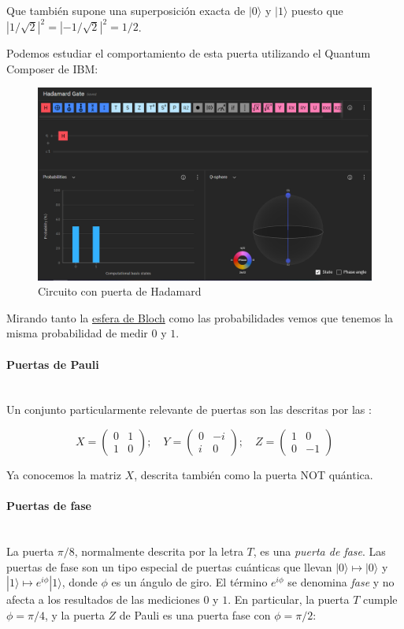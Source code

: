 \documentclass[11pt]{article}
\newcommand{\ra}{\rangle}
\newcommand{\myparagraph}[1]{\paragraph*{#1}\mbox{}\\}
\begin{document}
Que también supone una superposición exacta de $|0\ra$ y $|1\ra$ puesto que $|1/\sqrt 2|^2 = |-1/\sqrt 2|^2 = 1/2$.

Podemos estudiar el comportamiento de esta puerta utilizando el Quantum Composer de IBM:

\begin{figure}[H]
	\centering
	\includegraphics[scale=0.5]{figures/gate-hadamard.png}
	\caption{Circuito con puerta de Hadamard}
\end{figure}

Mirando tanto la \href{URL}{esfera de Bloch} como las probabilidades vemos que tenemos la misma probabilidad de medir $0$ y $1$. \\


\myparagraph{Puertas de Pauli}


Un conjunto particularmente relevante de puertas son las descritas por las :

\[
X =
	\begin{pmatrix}
		0 & 1 \\
		1 & 0 
	\end{pmatrix}; \quad
	Y =
	\begin{pmatrix}
		0 & -i \\
		i & 0 
	\end{pmatrix}; \quad
	Z =
	\begin{pmatrix}
		1 & 0 \\
		0 & -1 
	\end{pmatrix}
\]

Ya conocemos la matriz $X$, descrita también como la puerta NOT quántica. \\


\myparagraph{Puertas de fase}


La puerta $\pi/8$, normalmente descrita por la letra $T$, es una \emph{puerta de fase}. Las puertas de fase son un tipo especial de puertas cuánticas que llevan $|0\ra \mapsto |0\ra$ y $|1\ra \mapsto e^{i\phi}|1\ra$, donde $\phi$ es un ángulo de giro. El término $e^{i\phi}$ se denomina \emph{fase} y no afecta a los resultados de las mediciones $0$ y $1$. En particular, la puerta $T$ cumple $\phi = \pi/4$, y la puerta $Z$ de Pauli es una puerta fase con $\phi = \pi/2$:
\end{document}
